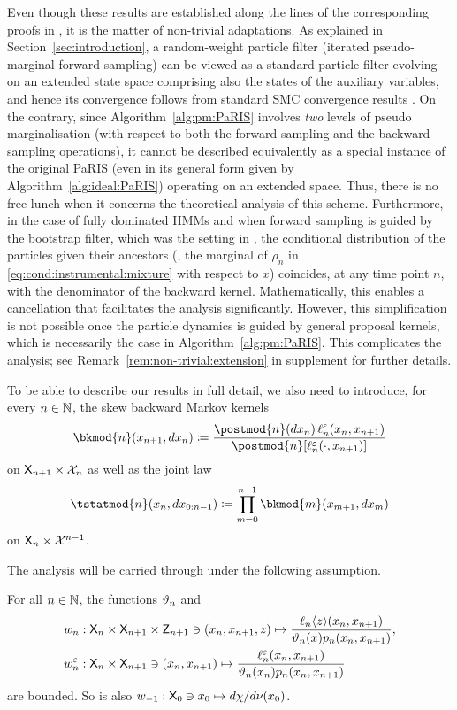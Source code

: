 Even though these results are established along the lines of the corresponding proofs in \cite{olsson:westerborn:2014b}, it is the matter of non-trivial adaptations. As explained in Section~\ref{sec:introduction}, a random-weight particle filter (iterated pseudo-marginal forward sampling) can be viewed as a standard particle filter evolving on an extended state space comprising also the states of the auxiliary variables, and hence its convergence follows from standard SMC convergence results \cite{fearnhead2008particle}. On the contrary, since Algorithm~\ref{alg:pm:PaRIS} involves \emph{two} levels of pseudo marginalisation (with respect to both the forward-sampling and the backward-sampling operations), it cannot be described equivalently as a special instance of the original PaRIS (even in its general form given by Algorithm~\ref{alg:ideal:PaRIS}) operating on an extended space. Thus, there is no free lunch when it concerns the theoretical analysis of this scheme. Furthermore, in the case of fully dominated HMMs and when forward sampling is guided by the bootstrap filter, which was the setting in \cite{olsson:westerborn:2014b}, the conditional distribution of the particles given their ancestors (\ie, the marginal of $\rho_n$ in \eqref{eq:cond:instrumental:mixture} with respect to $x$) coincides, at any time point $n$, with the denominator of the backward kernel. Mathematically, this enables a cancellation that facilitates the analysis significantly. However, this simplification is not possible once the particle dynamics is guided by general proposal kernels, which is necessarily the case in Algorithm~\ref{alg:pm:PaRIS}. This complicates the analysis; see Remark~\ref{rem:non-trivial:extension} in supplement for further details.

To be able to describe our results in full detail, we also need to introduce, for every $n \in \mathbb{N}$, the skew backward Markov kernels 
$$
    \bkmod{n}(x_{n + 1}, \rmd x_n) \eqdef \frac{\postmod{n}(\rmd x_n) \, \udmod{n}(x_n, x_{n + 1})}{\postmod{n}[\udmod{n}(\cdot, x_{n + 1})]}
$$
on $\mathsf{X}_{n + 1} \times \mathcal{X}_n$ as well as the joint law 
\begin{equation} \label{eq:skew:backward:law}
\tstatmod{n}(x_n, \rmd x_{0:n - 1}) \eqdef \prod_{m = 0}^{n - 1} \bkmod{m}(x_{m + 1}, \rmd x_m)
\end{equation}
on $\mathsf{X}_n \times \mathcal{X}^{n - 1}$. 

The analysis will be carried through under the following assumption.
\begin{hypH}
\label{assum:bound:filter:pseudomarginal}
For all $n \in \mathbb{N}$, the functions $\vartheta_{n}$ and  
\begin{align*}
&\wgtfuncext{n} : \Xset_n \times \Xset_{n + 1} \times \Zset_{n + 1} \ni (x_n, x_{n + 1}, z) \mapsto \frac{\ukest{n}{z}(x_n, x_{n + 1})}{\adjfuncforward{n}(x) \kissforward{n}{n}(x_n, x_{n + 1})}, \\
&\wgtfuncmod{n} : \Xset_n \times \Xset_{n + 1} \ni (x_n, x_{n + 1}) \mapsto \frac{\udmod{n}(x_n, x_{n + 1})}{\adjfuncforward{n}(x_n) \kissforward{n}{n}(x_n, x_{n + 1})}
\end{align*}
are bounded. So is also $w_{-1} : \mathsf{X}_0 \ni x_0 \mapsto d \chi / d \nu(x_0)$. 
\end{hypH}

